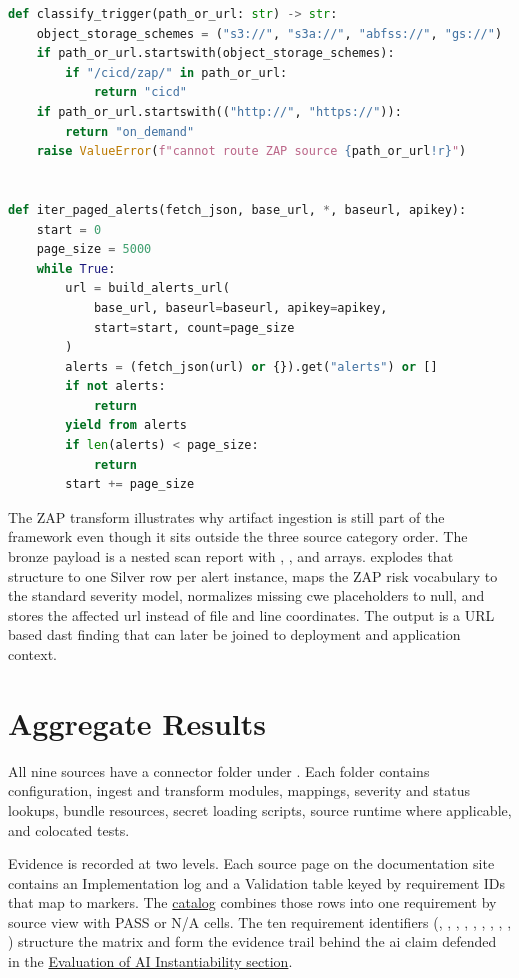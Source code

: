 \begin{lstlisting}[language=Python,caption={[OWASP ZAP trigger routing and alert paging]\texttt{src/connectors/owasp\_zap/ingest.py} (excerpt)},label={lst:zap-ingest}]
def classify_trigger(path_or_url: str) -> str:
    object_storage_schemes = ("s3://", "s3a://", "abfss://", "gs://")
    if path_or_url.startswith(object_storage_schemes):
        if "/cicd/zap/" in path_or_url:
            return "cicd"
    if path_or_url.startswith(("http://", "https://")):
        return "on_demand"
    raise ValueError(f"cannot route ZAP source {path_or_url!r}")


def iter_paged_alerts(fetch_json, base_url, *, baseurl, apikey):
    start = 0
    page_size = 5000
    while True:
        url = build_alerts_url(
            base_url, baseurl=baseurl, apikey=apikey,
            start=start, count=page_size
        )
        alerts = (fetch_json(url) or {}).get("alerts") or []
        if not alerts:
            return
        yield from alerts
        if len(alerts) < page_size:
            return
        start += page_size
\end{lstlisting}

The ZAP transform illustrates why artifact ingestion is still part of the framework even though it sits outside the three source category order. The bronze payload is a nested scan report with , , and  arrays.  explodes that structure to one Silver row per alert instance, maps the ZAP risk vocabulary to the standard severity model, normalizes missing \gls{cwe} placeholders to null, and stores the affected \gls{url} instead of file and line coordinates. The output is a URL based \gls{dast} finding that can later be joined to deployment and application context.

\section{Aggregate Results}
\label{sec:impl-results}

All nine sources have a connector folder under . Each folder contains configuration, ingest and transform modules, mappings, severity and status lookups, bundle resources, secret loading scripts, source runtime where applicable, and colocated tests.

Evidence is recorded at two levels. Each source page on the documentation site contains an Implementation log and a Validation table keyed by requirement IDs that map to  markers. The \href{https://vkraus.github.io/appsec-mvp/platform/reference/catalog/}{catalog} combines those rows into one requirement by source view with PASS or N/A cells. The ten requirement identifiers (, , , , , , , , , ) structure the matrix and form the evidence trail behind the \gls{ai} claim defended in the \hyperref[sec:ai-eval]{Evaluation of AI Instantiability section}.


